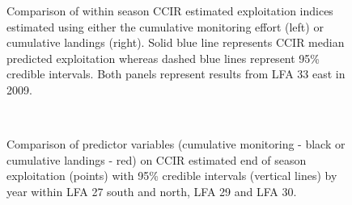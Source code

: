\documentclass[11pt]{article}
\newcommand{\D}{.}
\newcommand{\e}{/backup/bio_data/bio.lobster/figures/} %
\begin{document}
\begin{landscape}
\begin{figure}
\centering
             \caption{Comparison of within season CCIR estimated exploitation indices estimated using either the cumulative monitoring effort (left) or cumulative landings (right). Solid blue line represents CCIR median predicted exploitation whereas dashed blue lines represent 95\% credible intervals. Both panels represent results from LFA 33 east in 2009.}
\end{figure}

\end{landscape}


\begin{figure}
        \centering
         \\
                 \caption{Comparison of predictor variables (cumulative monitoring - black or cumulative landings - red) on CCIR estimated end of season exploitation (points) with 95\% credible intervals (vertical lines) by year within LFA 27 south and north, LFA 29 and LFA 30.}
        \end{figure}
\end{document}
